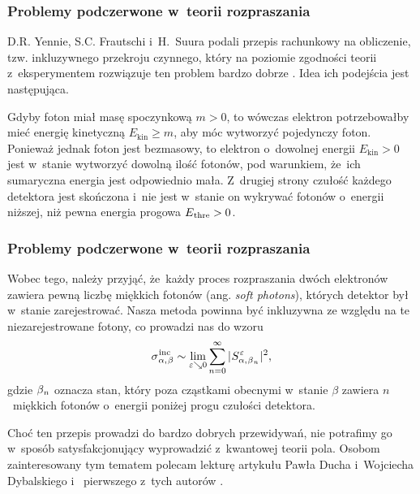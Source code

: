 \documentclass[10pt,t]{beamer}
\begin{document}
\begin{frame}
  \frametitle{Problemy podczerwone w~teorii rozpraszania}


  D.R. Yennie, S.C. Frautschi i~H.~Suura podali przepis rachunkowy na
  obliczenie, tzw. inkluzywnego przekroju czynnego, który na poziomie
  zgodności teorii z~eksperymentem rozwiązuje ten problem bardzo dobrze
  \parencite{Yennie-Frautschi-Suura-The-infrared-divergence-ETC-Pub-1961}.
  Idea ich podejścia jest następująca.

  Gdyby foton miał masę spoczynkową $m > 0$, to wówczas elektron
  potrzebowałby mieć energię kinetyczną $E_{ \text{kin} } \geq m$, aby móc
  wytworzyć pojedynczy foton. Ponieważ jednak foton jest bezmasowy, to
  elektron o~dowolnej energii $E_{ \text{kin} } > 0$ jest w~stanie
  wytworzyć \alert{dowolną} ilość fotonów, pod warunkiem, że~ich sumaryczna
  energia jest odpowiednio mała. Z~drugiej strony czułość każdego detektora
  jest skończona i~nie jest w~stanie on wykrywać fotonów o~energii niższej,
  niż pewna energia progowa $E_{ \hspace{0.05em} \text{thre} } > 0$.

\end{frame}





\begin{frame}
  \frametitle{Problemy podczerwone w~teorii rozpraszania}


  Wobec tego, należy przyjąć, że~każdy proces rozpraszania dwóch elektronów
  zawiera pewną liczbę miękkich fotonów (ang. \textit{soft photons}),
  których detektor był w~stanie zarejestrować. Nasza metoda powinna być
  inkluzywna ze względu na te niezarejestrowane fotony, co prowadzi nas do
  wzoru
  \begin{equation}
    \label{eq:Glowne-rodzaje-problemow-podczerwonych-16}
    \sigma_{ \hspace{0.05em} \alpha, \hspace{0.07em} \beta }^{ \hspace{0.05em} \text{inc} } \sim
    \lim_{ \varepsilon \searrow 0 } \sum_{ n = 0 }^{ \infty }
    | \hspace{0.05em}  S_{ \alpha, \hspace{0.05em} \beta_{ \hspace{0.05em} n } }^{ \hspace{0.05em} \varepsilon }  \hspace{0.05em} |^{ 2 },
  \end{equation}
  gdzie $\beta_{ \hspace{0.05em} n }$ oznacza stan, który poza cząstkami obecnymi
  w~stanie $\beta$ zawiera $n$~miękkich fotonów o~energii poniżej progu
  czułości detektora.

  Choć ten przepis prowadzi do bardzo dobrych przewidywań, nie potrafimy
  go w~sposób satysfakcjonujący wyprowadzić z~kwantowej teorii pola.
  Osobom zainteresowany tym tematem polecam lekturę artykułu Pawła Ducha
  i~Wojciecha Dybalskiego 
  \parencite{Duch-Dybalski-Infrared-problem-in-quantum-electrodynamics-Pub-2023}
  i~
  pierwszego z~tych autorów
  \parencite{Duch-Infrared-problem-in-perturbative-quantum-ETC-Pub-2021}.

\end{frame}
\end{document}
